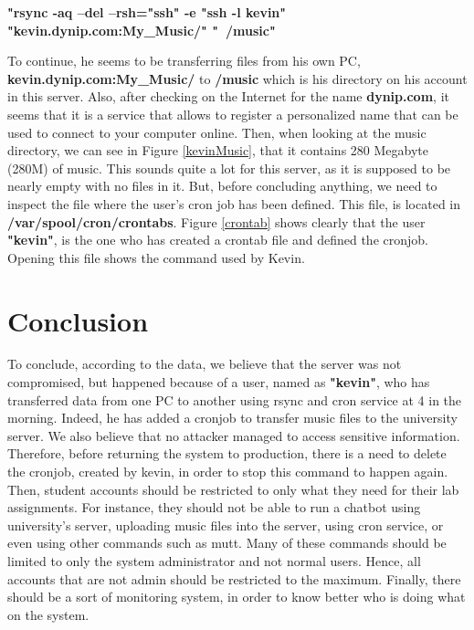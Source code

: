 \documentclass[a4paper,12pt]{article}
\begin{document}
\textbf{"rsync -aq --del --rsh="ssh" -e "ssh -l kevin" "kevin.dynip.com:My\_Music/" "~/music"}

To continue, he seems to be transferring files from his own PC, \textbf{kevin.dynip.com:My\_Music/} to \textbf{/music} which is his directory on his account in this server. Also, after checking on the Internet for the name \textbf{dynip.com}, it seems that it is a service that allows to register a personalized name that can be used to connect to your computer online. Then, when looking at the music directory, we can see in Figure \ref{kevinMusic}, that it contains 280 Megabyte (280M) of music. This sounds quite a lot for this server, as it is supposed to be nearly empty with no files in it. But, before concluding anything, we need to inspect the file where the user's cron job has been defined. This file, is located in \textbf{/var/spool/cron/crontabs}. Figure \ref{crontab} shows clearly that the user \textbf{"kevin"}, is the one who has created a crontab file and defined the cronjob. Opening this file shows the command used by Kevin. 



\section{Conclusion}
To conclude, according to the data, we believe that the server was not compromised, but happened because of a user, named as \textbf{"kevin"}, who has transferred data from one PC to another using rsync and cron service at 4 in the morning. Indeed, he has added a cronjob to transfer music files to the university server. We also believe that no attacker managed to access sensitive information. Therefore, before returning the system to production, there is a need to delete the cronjob, created by kevin, in order to stop this command to happen again. Then, student accounts should be restricted to only what they need for their lab assignments. For instance, they should not be able to run a chatbot using university's server, uploading music files into the server, using cron service, or even using other commands such as mutt. Many of these commands should be limited to only the system administrator and not normal users. Hence, all accounts that are not admin should be restricted to the maximum. Finally, there should be a sort of monitoring system, in order to know better who is doing what on the system. 
\end{document}
